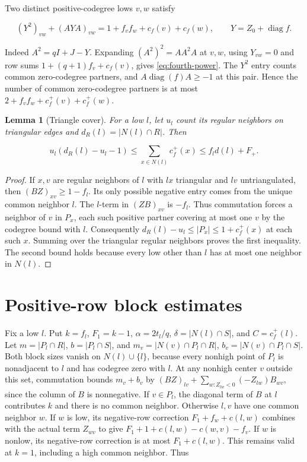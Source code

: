 \documentclass[11pt,reqno]{amsart}
\newtheorem{lemma}[theorem]{Lemma}
\theoremstyle{definition}
\theoremstyle{remark}
\numberwithin{equation}{section}
\DeclareMathOperator{\diag}{diag}
\begin{document}
Two distinct positive-codegree lows \(v,w\) satisfy

\begin{equation}\label{eq:fourth-power}
(Y^2)_{vw}+(AYA)_{vw}=1+f_v f_w+c_f(v)+c_f(w),
\qquad Y=Z_0+\diag  f .
\end{equation}

Indeed \(A^2=qI+J-Y\). Expanding \((A^2)^2=AA^2A\) at \(v,w\), using \(Y_{vw}=0\) and row sums \(1+(q+1)f_v+c_f(v)\), gives \eqref{eq:fourth-power}. The \(Y^2\) entry counts common zero-codegree partners, and \(A\diag (f)A\ge-1\) at this pair. Hence the number of common zero-codegree partners is at most \(2+f_v f_w+c_f^+(v)+c_f^+(w)\).

\begin{lemma}[Triangle cover]\label{lem:triangle}
For a low \(l\), let \(u_l\) count its regular neighbors on triangular edges and \(d_R(l)=|N(l)\cap R|\). Then

\begin{equation}\label{eq:triangle-cover}
u_l(d_R(l)-u_l-1)\le \sum_{x\in N(l)}c_f^+(x)\le f_l d(l)+F_+ .
\end{equation}

\end{lemma}
\begin{proof}
If \(x,v\) are regular neighbors of \(l\) with \(lx\) triangular and \(lv\) untriangulated, then \((BZ)_{xv}\ge1-f_l\). Its only possible negative entry comes from the unique common neighbor \(l\). The \(l\)-term in \((ZB)_{xv}\) is \(-f_l\). Thus commutation forces a neighbor of \(v\) in \(P_x\), each such positive partner covering at most one \(v\) by the codegree bound with \(l\). Consequently \(d_R(l)-u_l\le |P_x|\le1+c_f^+(x)\) at each such \(x\).
Summing over the triangular regular neighbors proves the first inequality. The second bound holds because every low other than \(l\) has at most one neighbor in \(N(l)\).
\end{proof}


\section{Positive-row block estimates}\label{sec:blocks}

Fix a low \(l\). Put \(k=f_l\), \(F_1=k-1\), \(\alpha=2t_l/q\), \(\delta=|N(l)\cap S|\), and \(C=c_f^+(l)\). Let \(m=|P_l\cap R|\), \(b=|P_l\cap S|\), and \(m_v=|N(v)\cap P_l\cap R|\), \(b_v=|N(v)\cap P_l\cap S|\). Both block sizes vanish on \(N(l)\cup\{l\}\), because every nonhigh point of \(P_l\) is nonadjacent to \(l\) and has codegree zero with \(l\). At any nonhigh center \(v\) outside this set, commutation bounds \(m_v+b_v\) by \((BZ)_{lv}+\sum_{w:Z_{lw}<0}(-Z_{lw})B_{wv}\), since the column of \(B\) is nonnegative. If \(v\in P_l\), the diagonal term of \(B\) at \(l\) contributes \(k\) and there is no common neighbor. Otherwise \(l,v\) have one common neighbor \(w\). If \(w\) is low, its negative-row correction \(F_1+f_w+c(l,w)\) combines with the actual term \(Z_{wv}\) to give \(F_1+1+c(l,w)-c(w,v)-f_v\). If \(w\) is nonlow, its negative-row correction is at most \(F_1+c(l,w)\). This remains valid at \(k=1\), including a high common neighbor. Thus
\end{document}
